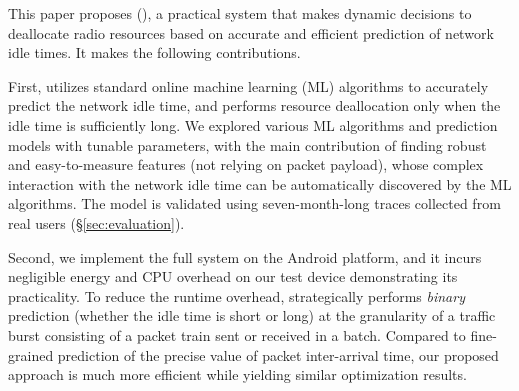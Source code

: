 

This paper proposes \NAMEFULL (\NAME), a practical system that makes dynamic decisions to deallocate radio resources based on accurate and efficient prediction of network idle times. It makes the following contributions.




First, \NAME utilizes standard online machine learning (ML) algorithms to accurately predict the network idle time, and performs resource deallocation only when the idle time is sufficiently long. We explored various ML algorithms and prediction models with tunable parameters, with the main contribution of finding robust and easy-to-measure features (not relying on packet payload), whose complex interaction with the network idle time can be automatically discovered by the ML algorithms. The model is validated using seven-month-long traces collected from real users (\S\ref{sec:evaluation}).

Second, we implement the full \NAME system on the Android platform, and it incurs negligible energy and CPU overhead on our test device demonstrating its practicality. To reduce the runtime overhead, \NAME strategically performs \emph{binary} prediction (\ie whether the idle time is short or long) at the granularity of a traffic burst consisting of a packet train sent or received in a batch. Compared to fine-grained prediction of the precise value of packet inter-arrival time, our proposed approach is much more efficient while yielding similar optimization results.

